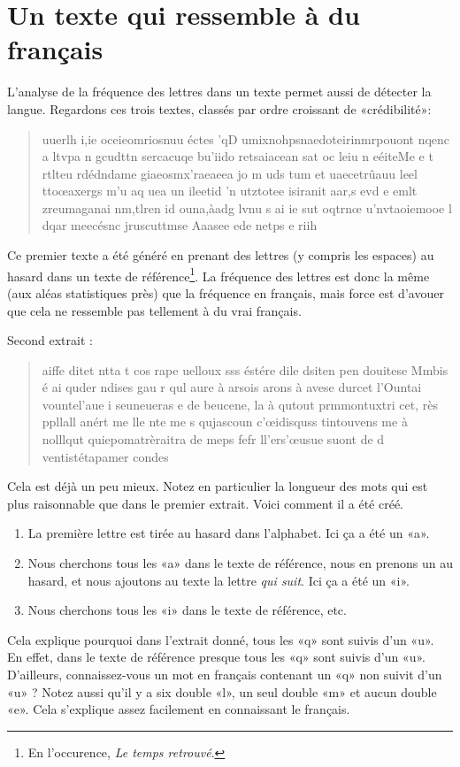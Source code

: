 \section{Un texte qui ressemble à du français}

L'analyse de la fréquence des lettres dans un texte permet aussi de détecter la langue. Regardons ces trois textes, classés par ordre croissant de «crédibilité»:

\begin{quote}
    uuerlh i,ie oceieomriosnuu éctes 'qD umixnohpsnaedoteirinmrpouont nqenc a ltvpa n gcudttn  sercacuqe bu'iido retsaiacean sat oc leiu n  eéiteMe e   t  rtlteu rdédndame giaeosmx'raeaeea  jo m uds tum   et uaecetrûauu leel ttoœaxergs m'u aq uea un ileetid 'n utztotee isiranit aar,s evd e emlt zreumaganai nm,tlren id ouna,àadg lvnu s ai ie sut oqtrnœ u'nvtaoiemooe l  dqar meecésnc  jruscuttmse Aaasee ede netps  e riih
\end{quote}
Ce premier texte a été généré en prenant des lettres (y compris les espaces) au hasard dans un texte de référence\footnote{En l'occurence, \emph{Le temps retrouvé}.}. La fréquence des lettres est donc la même (aux aléas statistiques près) que la fréquence en français, mais force est d'avouer que cela ne ressemble pas tellement à du vrai français.
 
Second extrait :
\begin{quote}
    aiffe ditet ntta t cos rape uelloux sss éstére dile dsiten pen douitese Mmbis é ai quder ndises gau r qul aure à arsois arons à avese durcet l'Ountai vountel'aue i seuneueras e de beucene, la à qutout prmmontuxtri cet, rès ppllall anért me lle nte me s qujascoun c'œidisquss tintouvens me à nolllqut quiepomatrèraitra de meps fefr ll'ers'œusue suont de d ventistétapamer condes
\end{quote}
Cela est déjà un peu mieux. Notez en particulier la longueur des mots qui est plus raisonnable que dans le premier extrait. Voici comment il a été créé.
\begin{enumerate}
    \item
        La première lettre est tirée au hasard dans l'alphabet. Ici ça a été un «a».
    \item
        Nous cherchons tous les «a» dans le texte de référence, nous en prenons un au hasard, et nous ajoutons au texte la lettre \emph{qui suit}. Ici ça a été un «i». 
    \item
        Nous cherchons tous les «i» dans le texte de référence, etc.
\end{enumerate}
Cela explique pourquoi dans l'extrait donné, tous les «q» sont suivis d'un «u». En effet, dans le texte de référence presque tous les «q» sont suivis d'un «u». D'ailleurs, connaissez-vous un mot en français contenant un «q» non suivit d'un «u» ? Notez aussi qu'il y a six double «l», un seul double «m» et aucun double «e». Cela s'explique assez facilement en connaissant le français.

